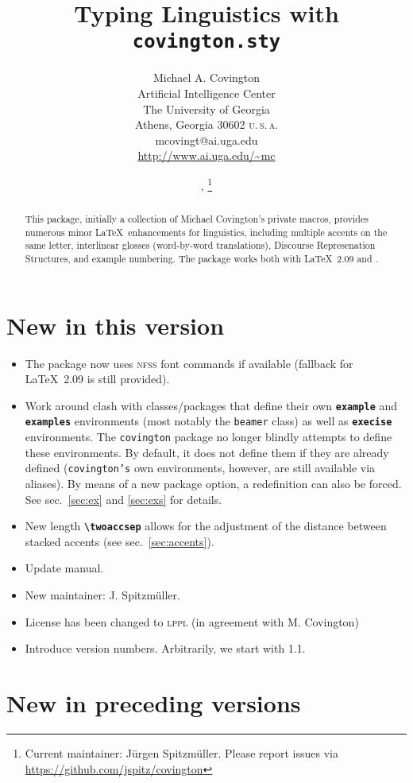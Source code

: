 \documentclass[english]{article}
\title{\textbf{Typing Linguistics with \texttt{covington.sty}}}
\author{Michael A. Covington \\
        \small Artificial Intelligence Center \\
        \small The University of Georgia \\
        \small Athens, Georgia 30602 \textsc{u.\,s.\,a.}\\
        mcovingt@ai.uga.edu\\
        \url{http://www.ai.uga.edu/~mc}}
\date{\pversion, \pdate\thanks{Current maintainer: J\"urgen Spitzm\"uller.
      Please report issues via \protect\url{https://github.com/jspitz/covington}}}
\newcommand*\jmacro[1]{\textbf{\texttt{#1}}}
\newcommand*\jenv[1]{\textbf{\texttt{#1}}}
\newcommand*\jcsmacro[1]{\jmacro{\textbackslash{#1}}}
\begin{document}
\maketitle

\begin{abstract}
\noindent This package, initially a collection of Michael Covington's private macros, provides
numerous minor \LaTeX\ enhancements for linguistics, including multiple accents on the
same letter, interlinear glosses (word-by-word translations), Discourse Represenation Structures,
and example numbering. The package works both with \LaTeX\ 2.09 and \LaTeXe.
\end{abstract}

{\footnotesize \tableofcontents}


\section*{New in this version}

\begin{itemize}
\item The package now uses \textsc{nfss} font commands if available (fallback for \LaTeX\ 2.09 is still provided).
\item Work around clash with classes\slash packages that define their own \jenv{example} and \jenv{examples} environments (most notably the \texttt{beamer} class) as well as \jenv{execise} environments. The \texttt{covington} package no longer blindly attempts to define these environments. By default, it does not define them if they are already defined (\texttt{covington's} own environments, however, are still available via aliases). By means of a new package option, a redefinition can also be forced.  See sec.~\ref{sec:ex} and \ref{sec:exs}
for details.
\item New length \jcsmacro{twoaccsep} allows for the adjustment of the distance between stacked accents (see sec.~\ref{sec:accents}).
\item Update manual.
\item New maintainer: J. Spitzm\"uller.
\item License has been changed to \textsc{lppl} (in agreement with M. Covington)
\item Introduce version numbers. Arbitrarily, we start with 1.1.
\end{itemize}


\section*{New in preceding versions}
\end{document}
